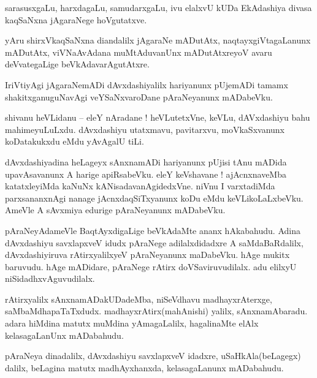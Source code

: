 \documentclass{article}
\begin{document}
\begin{mn}%
sarasusxgaLu, harxdagaLu, samudarxgaLu, ivu elalxvU kUDa EkAdashiya divasa kaqSaNxna jAgaraNege 
hoVgutatxve.
\end{mn}

\begin{mn}%
yAru shirxVkaqSaNxna diandalilx jAgaraNe mADutAtx, naqtayxgiVtagaLanunx mADutAtx, viVNaAvAdana 
muMtAduvanUnx mADutAtxreyoV avaru deVvategaLige beVkAdavarAgutAtxre.
\end{mn}

\begin{mn}%
IriVtiyAgi jAgaraNemADi dAvxdashiyalilx hariyanunx pUjemADi tamamx shakitxganuguNavAgi 
veYSaNxvaroDane pAraNeyanunx mADabeVku.
\end{mn}

\begin{mn}%
shivanu heVLidanu -- eleY nAradane ! heVLutetxVne, keVLu, dAVxdashiyu bahu mahimeyuLuLxdu. 
dAvxdashiyu utatxmavu, pavitarxvu, moVkaSxvanunx koDatakukxdu eMdu yAvAgalU tiLi.
\end{mn}

\begin{mn}%
dAvxdashiyadina heLageyx sAnxnamADi hariyanunx pUjisi tAnu mADida upavAsavanunx A harige 
apiRsabeVku. eleY keVshavane ! ajAcnxnaveMba katatxleyiMda kaNuNx kANisadavanAgidedxVne. niVnu I 
varxtadiMda parxsananxnAgi nanage jAcnxdaqSiTxyanunx koDu eMdu keVLikoLaLxbeVku. AmeVle A sAvxmiya 
edurige pAraNeyanunx mADabeVku.
\end{mn}

\begin{mn}%
pAraNeyAdameVle BaqtAyxdigaLige beVkAdaMte ananx hAkabahudu. Adina dAvxdashiyu savxlapxveV idudx 
pAraNege adilalxdidadxre A saMdaBaRdalilx, dAvxdashiyiruva rAtirxyalilxyeV pAraNeyanunx maDabeVku. 
hAge mukitx baruvudu. hAge mADidare, pAraNege rAtirx doVSaviruvudilalx. adu elilxyU 
niSidadhxvAguvudilalx.
\end{mn}

\begin{mn}%
rAtirxyalilx sAnxnamADakUDadeMba, niSeVdhavu madhayxrAterxge, saMbaMdhapaTaTxdudx. 
madhayxrAtirx(mahAnishi) yalilx, sAnxnamAbaradu. adara hiMdina matutx muMdina yAmagaLalilx, 
hagalinaMte elAlx kelasagaLanUnx mADabahudu.
\end{mn}

\begin{mn}%
pAraNeya dinadalilx, dAvxdashiyu savxlapxveV idadxre, uSaHkAla(beLagegx) dalilx, beLagina matutx 
madhAyxhanxda, kelasagaLanunx mADabahudu.
\end{mn}
\end{document}

